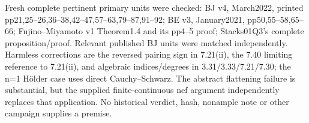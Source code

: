 \documentclass[
]{article}
\begin{document}
Fresh complete pertinent primary units were checked: BJ v4, March2022,
printed pp21,25--26,36--38,42--47,57--63,79--87,91--92; BE v3,
January2021, pp50,55--58,65--66; Fujino--Miyamoto v1 Theorem1.4 and its
pp4--5 proof; Stacks01Q3's complete proposition/proof. Relevant
published BJ units were matched independently. Harmless corrections are
the reversed pairing sign in 7.21(ii), the 7.40 limiting reference to
7.21(ii), and algebraic indices/degrees in 3.31/3.33/7.21/7.30; the n=1
Hölder case uses direct Cauchy--Schwarz. The abstract flattening failure
is substantial, but the supplied finite-continuous nef argument
independently replaces that application. No historical verdict, hash,
nonample note or other campaign supplies a premise.
\end{document}

